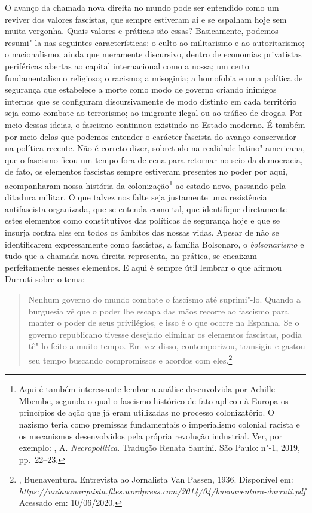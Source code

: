 O avanço da chamada nova direita no mundo pode ser entendido como um
reviver dos valores fascistas, que sempre estiveram aí e se espalham
hoje sem muita vergonha. Quais valores e práticas são essas?
Basicamente, podemos resumi"-la nas seguintes características: o culto ao
militarismo e ao autoritarismo; o nacionalismo, ainda que meramente
discursivo, dentro de economias privatistas periféricas abertas ao
capital internacional como a nossa; um certo fundamentalismo religioso;
o racismo; a misoginia; a homofobia e uma política de segurança que
estabelece a morte como modo de governo criando inimigos internos que se
configuram discursivamente de modo distinto em cada território seja como
combate ao terrorismo; ao imigrante ilegal ou ao tráfico de drogas. Por
meio dessas ideias, o fascismo continuou existindo no Estado moderno. É
também por meio delas que podemos entender o carácter fascista do avanço
conservador na política recente. Não é correto dizer, sobretudo na
realidade latino"-americana, que o fascismo ficou um tempo fora de cena
para retornar no seio da democracia, de fato, os elementos fascistas
sempre estiveram presentes no poder por aqui, acompanharam nossa
história da colonização\footnote{Aqui é também interessante lembar a
  análise desenvolvida por Achille Mbembe, segunda o qual o fascismo
  histórico de fato aplicou à Europa os princípios de ação que já eram
  utilizadas no processo colonizatório. O nazismo teria como premissas
  fundamentais o imperialismo colonial racista e os mecanismos
  desenvolvidos pela própria revolução industrial. Ver, por exemplo:
  , A. \emph{Necropolítica}. Tradução Renata Santini. São Paulo:
  n"-1, 2019, pp.~22--23.} ao estado novo, passando pela ditadura militar.
O que talvez nos falte seja justamente uma resistência antifascista
organizada, que se entenda como tal, que identifique diretamente estes
elementos como constitutivos das políticas de segurança hoje e que se
insurja contra eles em todos os âmbitos das nossas vidas. Apesar de não
se identificarem expressamente como fascistas, a família Bolsonaro, o
\emph{bolsonarismo} e tudo que a chamada nova direita representa, na
prática, se encaixam perfeitamente nesses elementos. E aqui é sempre
útil lembrar o que afirmou Durruti sobre o tema:

\begin{quote}
Nenhum governo do mundo combate o fascismo até suprimi"-lo. Quando a
burguesia vê que o poder lhe escapa das mãos recorre ao fascismo para
manter o poder de seus privilégios, e isso é o que ocorre na Espanha. Se
o governo republicano tivesse desejado eliminar os elementos fascistas,
podia tê"-lo feito a muito tempo. Em vez disso, contemporizou,
transigiu e gastou seu tempo buscando compromissos e acordos com
eles.\footnote{, Buenaventura. Entrevista ao Jornalista Van
  Passen, 1936. Disponível em:
  \emph{https://uniaoanarquista.files.wordpress.com/2014/04/buenaventura-durruti.pdf}
  Acessado em: 10/06/2020.}
\end{quote}

